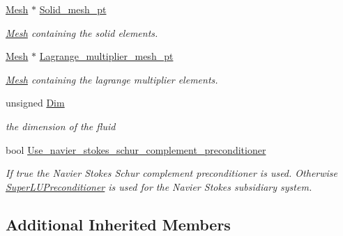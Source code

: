 \begin{DoxyCompactItemize}
\hyperlink{classoomph_1_1Mesh}{Mesh} $\ast$ \hyperlink{classoomph_1_1PseudoElasticFSIPreconditioner_afd02372d56906a9f86c5b00bf50297aa}{Solid\+\_\+mesh\+\_\+pt}
\begin{DoxyCompactList}\small\item\em \hyperlink{classoomph_1_1Mesh}{Mesh} containing the solid elements. \end{DoxyCompactList}\item 
\hyperlink{classoomph_1_1Mesh}{Mesh} $\ast$ \hyperlink{classoomph_1_1PseudoElasticFSIPreconditioner_a0a75413264015a10ce59e7a31c7fe7c4}{Lagrange\+\_\+multiplier\+\_\+mesh\+\_\+pt}
\begin{DoxyCompactList}\small\item\em \hyperlink{classoomph_1_1Mesh}{Mesh} containing the lagrange multiplier elements. \end{DoxyCompactList}\item 
unsigned \hyperlink{classoomph_1_1PseudoElasticFSIPreconditioner_aec1e28a3a746a76ed6a283115e8d3146}{Dim}
\begin{DoxyCompactList}\small\item\em the dimension of the fluid \end{DoxyCompactList}\item 
bool \hyperlink{classoomph_1_1PseudoElasticFSIPreconditioner_aa9eab77e9d4dfbdecfac9cccceb68c7b}{Use\+\_\+navier\+\_\+stokes\+\_\+schur\+\_\+complement\+\_\+preconditioner}
\begin{DoxyCompactList}\small\item\em If true the Navier Stokes Schur complement preconditioner is used. Otherwise \hyperlink{classoomph_1_1SuperLUPreconditioner}{Super\+L\+U\+Preconditioner} is used for the Navier Stokes subsidiary system. \end{DoxyCompactList}\end{DoxyCompactItemize}
\subsection*{Additional Inherited Members}


